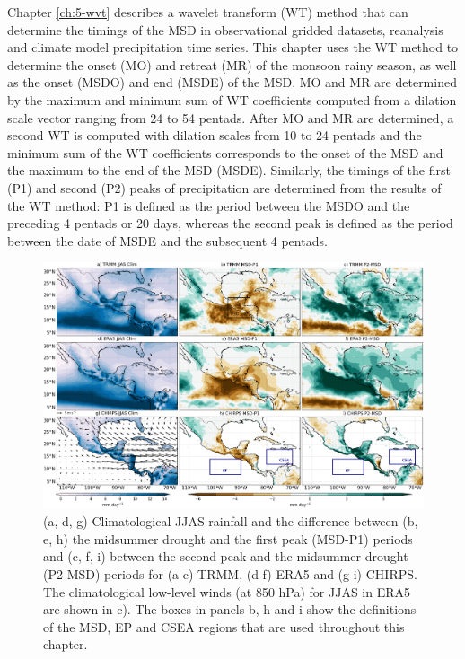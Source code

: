 Chapter \ref{ch:5-wvt} describes a wavelet transform (WT) method that can determine the timings of the MSD in observational gridded datasets, reanalysis and climate model precipitation time series. 
This chapter uses the WT method to determine the onset (MO) and retreat (MR) of the monsoon rainy season, as well as the onset  (MSDO) and end (MSDE) of the MSD. 
 MO and MR are determined by the maximum and minimum sum of WT coefficients computed from a dilation scale vector ranging from 24 to 54 pentads. After MO and MR are determined, a second WT is computed with dilation scales from 10 to 24 pentads and the minimum sum of the WT coefficients corresponds to the onset of the MSD and the maximum to the end of the MSD (MSDE). 
Similarly, the timings of the first (P1) and second (P2) peaks of precipitation are determined from the results of the WT method: P1 is defined as the period between the MSDO and the preceding 4 pentads or 20 days, whereas the second peak is defined as the period between the date of MSDE and the subsequent 4 pentads.

  \begin{figure}[b!]
\includegraphics[width=\linewidth]{figures/fig2obs_prdiff_2.png}
\caption[Observed composites of climatological and seasonal variations of precipitation.]{ (a, d, g) Climatological JJAS rainfall and the difference between  (b, e, h)  the midsummer drought and the first peak (MSD-P1) periods and (c, f, i)  between the second peak and the midsummer drought (P2-MSD) periods for (a-c) TRMM, (d-f) ERA5 and (g-i) CHIRPS. The climatological low-level winds (at 850 hPa) for JJAS in ERA5 are shown in c). The boxes in panels b, h and i show the definitions of the MSD, EP and CSEA regions that are used throughout this chapter.  }
\label{fig:eof2}
\end{figure} 


